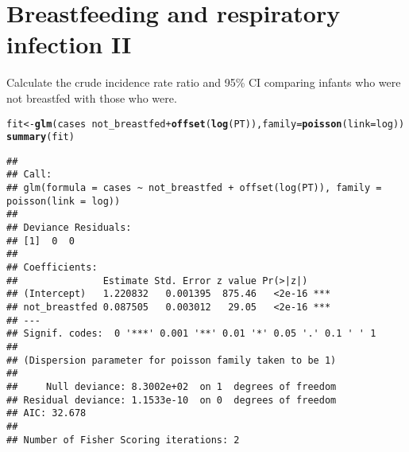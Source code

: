 \documentclass[landscape,twocolumn,letterpaper,9pt,reqno]{article}\usepackage[]{graphicx}\usepackage[]{color}
\newcommand{\hlopt}[1]{\textcolor[rgb]{0,0,0}{#1}}%
\newcommand{\hlstd}[1]{\textcolor[rgb]{0.345,0.345,0.345}{#1}}%
\newcommand{\hlkwb}[1]{\textcolor[rgb]{0.69,0.353,0.396}{#1}}%
\newcommand{\hlkwc}[1]{\textcolor[rgb]{0.333,0.667,0.333}{#1}}%
\newcommand{\hlkwd}[1]{\textcolor[rgb]{0.737,0.353,0.396}{\textbf{#1}}}%
\newenvironment{knitrout}{}{} %
\begin{document}
\section{Breastfeeding and respiratory infection II}

Calculate the crude incidence rate ratio and 95\% CI comparing infants who were not breastfed with those who were.

\begin{knitrout}\small
{}\color{fgcolor}
\begin{alltt}
\hlstd{fit} \hlkwb{<-} \hlkwd{glm}\hlstd{(cases} \hlopt{~} \hlstd{not_breastfed} \hlopt{+} \hlkwd{offset}\hlstd{(}\hlkwd{log}\hlstd{(PT)),} \hlkwc{family} \hlstd{=} \hlkwd{poisson}\hlstd{(}\hlkwc{link} \hlstd{= log))}
\hlkwd{summary}\hlstd{(fit)}
\end{alltt}
\begin{verbatim}
## 
## Call:
## glm(formula = cases ~ not_breastfed + offset(log(PT)), family = poisson(link = log))
## 
## Deviance Residuals: 
## [1]  0  0
## 
## Coefficients:
##               Estimate Std. Error z value Pr(>|z|)    
## (Intercept)   1.220832   0.001395  875.46   <2e-16 ***
## not_breastfed 0.087505   0.003012   29.05   <2e-16 ***
## ---
## Signif. codes:  0 '***' 0.001 '**' 0.01 '*' 0.05 '.' 0.1 ' ' 1
## 
## (Dispersion parameter for poisson family taken to be 1)
## 
##     Null deviance: 8.3002e+02  on 1  degrees of freedom
## Residual deviance: 1.1533e-10  on 0  degrees of freedom
## AIC: 32.678
## 
## Number of Fisher Scoring iterations: 2
\end{verbatim}

\end{knitrout}
\end{document}
